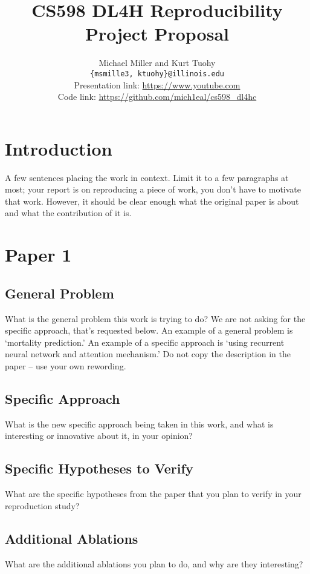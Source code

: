 \documentclass[11pt,a4paper]{article}
\title{CS598 DL4H Reproducibility Project Proposal}
\author{Michael Miller and Kurt Tuohy \\
  \texttt{\{msmille3, ktuohy\}@illinois.edu}
  \\[2em]
  Presentation link: \url{https://www.youtube.com} \\
  Code link: \url{https://github.com/mich1eal/cs598_dl4hc}}
\begin{document}
\maketitle


\section{Introduction}
A  few  sentences  placing  the  work  in  context. Limit it to a few paragraphs at most; your report is on reproducing a piece of work, you don’t have to motivate that work. However, it should be clear enough what the original paper is about and what the contribution of it is.


\section{Paper 1}
\subsection{General Problem}
What is the general problem this work is trying to do? We are not asking for the specific approach, that’s requested below. An example of a general problem is ‘mortality prediction.’ An example of a specific approach is ‘using recurrent neural network and attention mechanism.’ Do not copy the description in the paper – use your own rewording.

\subsection{Specific Approach}
What is the new specific approach being taken in this work, and what is interesting or innovative about it, in your opinion?

\subsection{Specific Hypotheses to Verify}
What are the specific hypotheses from the paper that you plan to verify in your reproduction study?

\subsection{Additional Ablations}
What are the additional ablations you plan to do, and why are they interesting?
\end{document}
